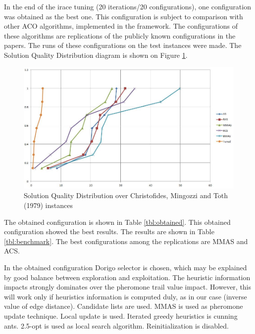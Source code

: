 \documentclass[12pt,a4paper,oneside]{book}
\begin{document}
In the end of the irace tuning (20 iterations/20 configurations), one configuration was obtained as the best one. This configuration is subject to comparison with other ACO algorithms, implemented in the framework. The configurations of these algorithms are replications of the publicly known configurations in the papers. The runs of these configurations on the test instances were made. The Solution Quality Distribution diagram is shown on Figure \ref{fig:sqd-cmt}.

\begin{figure}[h]
  \centering
    \includegraphics[scale=0.65]{sqd-benchmark.jpg}
  \caption{Solution Quality Distribution over Christofides, Mingozzi and Toth (1979) instances}
  \label{fig:sqd-cmt}
\end{figure}

The obtained configuration is shown in Table \ref{tbl:obtained}. This obtained configuration showed the best results. The results are shown in Table \ref{tbl:benchmark}. The best configurations among the replications are MMAS and ACS.

In the obtained configuration Dorigo selector is chosen, which may be explained by good balance between exploration and exploitation. The heuristic information impacts strongly dominates over the pheromone trail value impact. However, this will work only if heuristics information is computed duly, as in our case (inverse value of edge distance). Candidate lists are used. MMAS is used as pheromone update technique. Local update is used. Iterated greedy heuristics is cunning ants. 2.5-opt is used as local search algorithm. Reinitialization is disabled.
\end{document}
